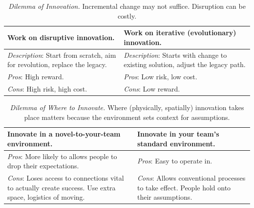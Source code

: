 \begin{center}
\begin{table}[H] %
\begin{tabular}{ | m{\dilemmatablewidth}| m{\dilemmatablewidth} | } 
  \hline
  \textbf{Work on disruptive innovation.} &
  \textbf{Work on iterative (evolutionary) innovation.} \\
  \hline
  \textit{Description}: Start from scratch, aim for revolution, replace the legacy.  &
  \textit{Description}: Starts with change to existing solution, adjust the legacy path.  \\  
  \hline
  \textit{Pros}: High reward. & 
  \textit{Pros}: Low risk, low cost. \\
  \hline
  \textit{Cons}: High risk, high cost. & 
  \textit{Cons}: Low reward. \\
  \hline
\end{tabular}
\caption{\textit{Dilemma of Innovation.}
Incremental change may not suffice. Disruption can be costly.
}
\label{table:disruptive-or-iterative}
\end{table}
\end{center}

\begin{center}
\begin{table}[H] %
\begin{tabular}{ | m{\dilemmatablewidth}| m{\dilemmatablewidth} | } 
  \hline
  \textbf{Innovate in a novel-to-your-team environment.} &
  \textbf{Innovate in your team's standard environment.} \\
  \hline
  \textit{Pros}: More likely to allows people to drop their expectations.  & 
  \textit{Pros}: Easy to operate in. \\
  \hline
  \textit{Cons}: Loses access to connections vital to actually create success. Use extra space, logistics of moving. & 
  \textit{Cons}: Allows conventional processes to take effect. People hold onto their assumptions. \\
  \hline
\end{tabular}
\caption{\textit{Dilemma of Where to Innovate.}
Where (physically, spatially) innovation takes place matters because the environment sets context for assumptions.
}
\label{table:where-to-innovate}
\end{table}
\end{center}

